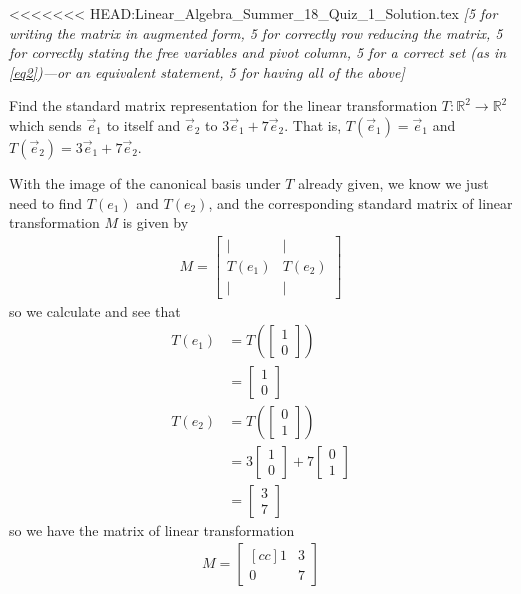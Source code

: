 \documentclass[answers,11pt]{exam}
\theoremstyle{definition}
\theoremstyle{definition}
\DeclareMathOperator{\1}{\mathbbm{1}}
\begin{document}
\begin{questions}
\begin{solution}
<<<<<<< HEAD:Linear_Algebra_Summer_18_Quiz_1_Solution.tex
	\textit{[5 for writing the matrix in augmented form, 5 for \textit{correctly} row reducing the matrix, 5 for \textit{correctly} stating the free variables and pivot column, 5 for a correct set (as in \eqref{eq2})---or an equivalent statement, 5 for having all of the above]}
\end{solution}




\question[25] Find the standard matrix representation for the linear transformation $T:\mathbb{R}^2\to \mathbb{R}^2$ which sends $\vec{e}_1$ to itself and $\vec{e}_2$ to $3\vec{e}_1+7\vec{e}_2$. That is, $T(\vec{e}_1)=\vec{e}_1$ and $T(\vec{e}_2)=3\vec{e}_1+7\vec{e}_2$. 

\begin{solution}
	
	With the image of the canonical basis under $T$ already given, we know we just need to find $T(e_1)$ and $T(e_2)$, and the corresponding standard matrix of linear transformation $M$ is given by
	\begin{align*}
	M = \begin{bmatrix}
	| & | \\ T(e_1) & T(e_2) \\ | & |
	\end{bmatrix}
	\end{align*}
	so we calculate and see that
	\begin{align}
	\nonumber T(e_1) &= T\left( \begin{bmatrix} 1 \\ 0 \end{bmatrix} \right) \\
	\label{eq3} \tag{$\star \star$} &= \begin{bmatrix} 1 \\ 0 \end{bmatrix} \\
	\nonumber T(e_2) &= T\left( \begin{bmatrix} 0 \\ 1 \end{bmatrix} \right) \\
	\nonumber &= 3 \begin{bmatrix} 1 \\ 0 \end{bmatrix} + 7 \begin{bmatrix} 0 \\ 1 \end{bmatrix} \\
	\label{eq4} \tag{$\ast \ast$} &= \begin{bmatrix} 3 \\ 7 \end{bmatrix}
	\end{align}
	so we have the matrix of linear transformation
	\begin{align}
	\label{eq5}
	\tag{$\dagger$}
	M = \begin{bmatrix}[c c]
	1 & 3 \\ 0 & 7
	\end{bmatrix}
	\end{align}
	

\end{solution}
\end{questions}
\end{document}
